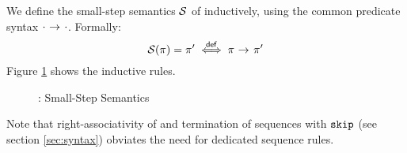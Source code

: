 
We define the small-step semantics $\mathcal{S}$ of \svlidf inductively, using the common predicate syntax ${\cdot} \,\,{\rightarrow^{}}\,\, {\cdot}$.
Formally: 
\begin{displaymath}
\mathcal{S}(\pi) = \pi' \overset{\textup{\textsf{def}}}{\iff} {\pi} \,\,{\rightarrow^{}}\,\, {\pi'}
\end{displaymath}
Figure \ref{fig:svl-sem-dyn-sstep} shows the inductive rules.
\begin{figure}
    \boxed{\sstep{\pi}{\pi}}
    
    \caption{\svlidf: Small-Step Semantics}
    \label{fig:svl-sem-dyn-sstep}
\end{figure}
Note that right-associativity of \ttt{;} and termination of sequences with $\textup{\texttt{skip}}$ (see section \ref{sec:syntax}) obviates the need for dedicated sequence rules.